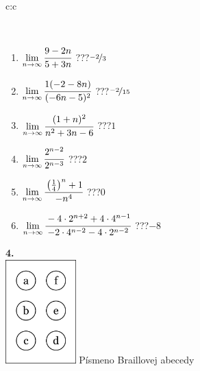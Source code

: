 \documentclass[10pt]{report}
\begin{document}
\begin{tabular}{c:c}
\begin{minipage}[c][104.5mm][t]{0.5\linewidth}
\begin{center}
\begin{minipage}{0.95\linewidth}
\begin{center}
\end{center}
\end{minipage}
\\[1mm]
\begin{minipage}{0.79\linewidth}
\begin{center}
\begin{varwidth}{\linewidth}
\begin{enumerate}
\normalsize
\item $\lim\limits_{n\to\infty}\cfrac{9-2n}{5+3n}$\quad \dotfill\; ???\;\dotfill \quad $\nicefrac{-2}{3}$
\item $\lim\limits_{n\to\infty}\cfrac{1(-2-8n)}{(-6n-5)^2}$\quad \dotfill\; ???\;\dotfill \quad $\nicefrac{-2}{15}$
\item $\lim\limits_{n\to\infty}\cfrac{(1+n)^2}{n^2+3n-6}$\quad \dotfill\; ???\;\dotfill \quad $1$
\item $\lim\limits_{n\to\infty}\cfrac{2^{n-2}}{2^{n-3}}$\quad \dotfill\; ???\;\dotfill \quad $2$
\item $\lim\limits_{n\to\infty}\cfrac{\left(\frac{1}{4}\right)^n +1}{-n^{4}}$\quad \dotfill\; ???\;\dotfill \quad $0$
\item $\lim\limits_{n\to\infty}\cfrac{-4\cdot 2^{n+2}+4\cdot 4^{n-1}}{-2\cdot 4^{n-2}-4\cdot 2^{n-2}}$\quad \dotfill\; ???\;\dotfill \quad $-8$
\end{enumerate}
\end{varwidth}
\end{center}
\end{minipage}
\begin{minipage}{0.20\linewidth}
\begin{center}
{\Huge\bfseries 4.} \\[2mm]
\includegraphics[height=40mm]{../images/braille.png}
{\small Písmeno Braillovej abecedy}
\end{center}
\end{minipage}
\end{center}
\end{minipage}
%
\end{tabular}
\newpage
\thispagestyle{empty}
\end{document}
